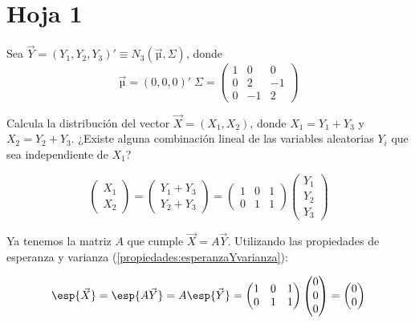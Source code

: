 

\section{Hoja 1}

\begin{problem}[1]
Sea $\vec{Y} = (Y_1,Y_2,Y_3)' ≡ N_3(\vec{µ},Σ)$, donde \[\vec{µ} = (0,0,0)'\;
Σ =\begin{pmatrix}
1&0&0\\
0&2&−1\\
0&−1&2
\end{pmatrix}
\]


\ppart  Calcula la distribución del vector $\vec{X} = (X_1,X_2)$, donde $X_1 = Y_1 + Y_3$ y $X_2 = Y_2 + Y_3$.
\ppart ¿Existe alguna combinación lineal de las variables aleatorias $Y_i$ que sea independiente de $X_1$?

\solution
{}


\spart 
\[
\begin{pmatrix}X_1 \\ X_2 \end{pmatrix} = \begin{pmatrix} Y_1 + Y_3 \\ Y_2 + Y_3 \end{pmatrix} = \begin{pmatrix} 1&0&1\\0&1&1 \end{pmatrix} \begin{pmatrix} Y_1\\Y_2\\Y_3 \end{pmatrix} 
\]

Ya tenemos la matriz $A$ que cumple $\vec{X} = A \vec{Y}$. Utilizando las propiedades de esperanza y varianza (\ref{propiedades:esperanzaYvarianza}):

\[\esp{\vec{X}} = \esp{A\vec{Y}} = A\esp{\vec{Y}} = \begin{pmatrix} 1&0&1\\0&1&1 \end{pmatrix} \begin{pmatrix} 0 \\0\\0\end{pmatrix} = \begin{pmatrix} 0\\0\end{pmatrix}\]


\end{problem}
